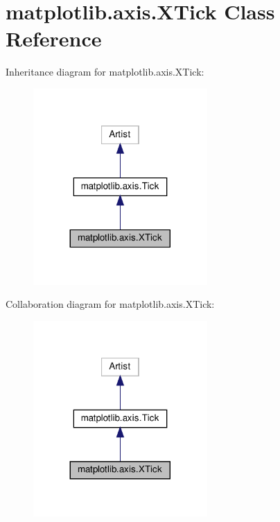 \hypertarget{classmatplotlib_1_1axis_1_1XTick}{}\section{matplotlib.\+axis.\+X\+Tick Class Reference}
\label{classmatplotlib_1_1axis_1_1XTick}


Inheritance diagram for matplotlib.\+axis.\+X\+Tick\+:
\nopagebreak
\begin{figure}[H]
\begin{center}
\leavevmode
\includegraphics[width=188pt]{classmatplotlib_1_1axis_1_1XTick__inherit__graph}
\end{center}
\end{figure}


Collaboration diagram for matplotlib.\+axis.\+X\+Tick\+:
\nopagebreak
\begin{figure}[H]
\begin{center}
\leavevmode
\includegraphics[width=188pt]{classmatplotlib_1_1axis_1_1XTick__coll__graph}
\end{center}
\end{figure}

